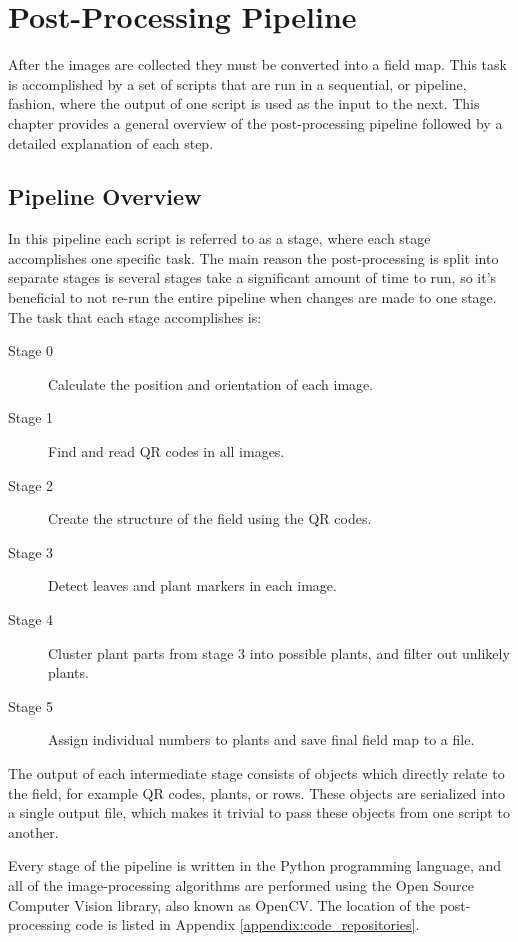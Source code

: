 
\cleardoublepage

\chapter{Post-Processing Pipeline}
\label{chapter:pipeline}

After the images are collected they must be converted into a field map. This task is accomplished by a set of scripts that are run in a sequential, or pipeline, fashion, where the output of one script is used as the input to the next.  This chapter provides a general overview of the post-processing pipeline followed by a detailed explanation of each step.

\section{Pipeline Overview}
\label{processing-overview}

In this pipeline each script is referred to as a stage, where each stage accomplishes one specific task.  The main reason the post-processing is split into separate stages is several stages take a significant amount of time to run, so it's beneficial to not re-run the entire pipeline when changes are made to one stage.  The task that each stage accomplishes is:

\begin{description}
\item[Stage 0] Calculate the position and orientation of each image.
\item[Stage 1] Find and read QR codes in all images.
\item[Stage 2] Create the structure of the field using the QR codes.
\item[Stage 3] Detect leaves and plant markers in each image.
\item[Stage 4] Cluster plant parts from stage 3 into possible plants, and filter out unlikely plants.
\item[Stage 5] Assign individual numbers to plants and save final field map to a file. 
\end{description}
 
The output of each intermediate stage consists of objects which directly relate to the field, for example QR codes, plants, or rows.  These objects are serialized into a single output file, which makes it trivial to pass these objects from one script to another. 

Every stage of the pipeline is written in the Python programming language, and all of the image-processing algorithms are performed using the Open Source Computer Vision library, also known as OpenCV.  The location of the post-processing code is listed in Appendix \ref{appendix:code_repositories}.

